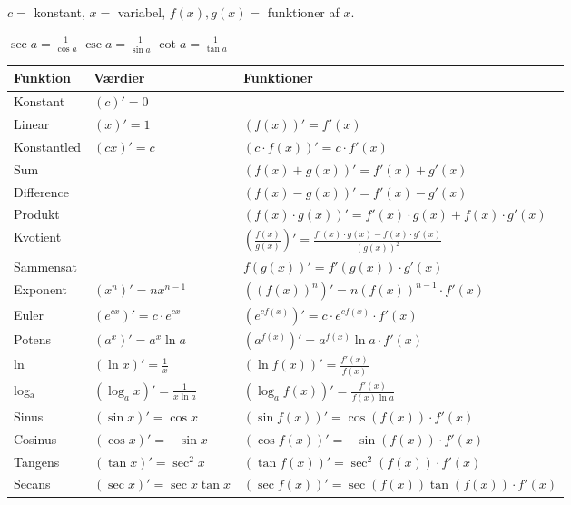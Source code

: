 
$c =$ konstant, $x =$ variabel, $f(x), g(x) =$ funktioner af $x$.
\
\begin{center}
    \(\sec a = \frac{1}{\cos a}\)  \quad \(\csc a = \frac{1}{\sin a}\) \quad \(\cot a = \frac{1}{\tan a}\)
\end{center}

\begin{table}[H]
\centering
\begingroup
\small
\renewcommand{\arraystretch}{1.6}
\begin{tabular}{@{}>{\raggedright}p{2.65cm}ll@{}}
\toprule
\textbf{Funktion} & \textbf{Værdier} & \textbf{Funktioner} \\
\midrule
Konstant & $(c)' = 0$ &  \\
Linear & $(x)' = 1$ & $(f(x))' = f'(x)$ \\
Konstantled & $(cx)' = c$ & $(c \cdot f(x))' = c \cdot f'(x)$ \\
\midrule
Sum &  & $(f(x) + g(x))' = f'(x) + g'(x)$ \\
Difference &  & $(f(x) - g(x))' = f'(x) - g'(x)$ \\
Produkt &  & $(f(x) \cdot g(x))' = f'(x) \cdot g(x) + f(x) \cdot g'(x)$ \\
Kvotient &  & $\left(\frac{f(x)}{g(x)}\right)' = \frac{f'(x) \cdot g(x) - f(x) \cdot g'(x)}{(g(x))^2}$ \\
Sammensat &  & $f(g(x))' = f'(g(x)) \cdot g'(x)$ \\
\midrule
Exponent & $(x^n)' = n x^{n-1}$ & $((f(x))^n)' = n (f(x))^{n-1} \cdot f'(x)$ \\
Euler & $(e^{c x})' = c \cdot e^{c x}$ & $(e^{c f(x)})' = c \cdot e^{c f(x)} \cdot f'(x)$ \\
Potens & $(a^x)' = a^x \ln a$ & $(a^{f(x)})' = a^{f(x)} \ln a \cdot f'(x)$ \\
ln & $(\ln x)' = \frac{1}{x}$ & $(\ln f(x))' = \frac{f'(x)}{f(x)}$ \\
log$_\text{a}$ & $(\log_a x)' = \frac{1}{x \ln a}$ & $(\log_a f(x))' = \frac{f'(x)}{f(x) \ln a}$ \\
\midrule
Sinus & $(\sin x)' = \cos x$ & $(\sin f(x))' = \cos(f(x)) \cdot f'(x)$ \\
Cosinus & $(\cos x)' = -\sin x$ & $(\cos f(x))' = -\sin(f(x)) \cdot f'(x)$ \\
Tangens & $(\tan x)' = \sec^2 x$ & $(\tan f(x))' = \sec^2(f(x)) \cdot f'(x)$ \\
Secans & $(\sec x)' = \sec x \tan x$ & $(\sec f(x))' = \sec(f(x)) \tan(f(x)) \cdot f'(x)$ \\

\end{tabular}
\end{table}
